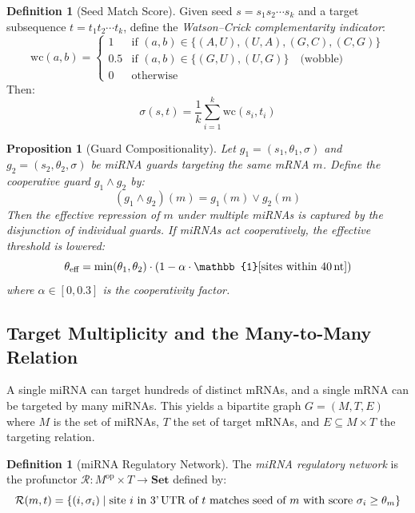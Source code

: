 \documentclass[12pt,a4paper]{article}
\newtheorem{proposition}[theorem]{Proposition}
\theoremstyle{definition}
\newtheorem{definition}[theorem]{Definition}
\newcommand{\Set}{\mathbf{Set}}
\begin{document}
\begin{definition}[Seed Match Score]\label{def:seed-score}
Given seed $s = s_1 s_2 \cdots s_k$ and a target subsequence
$t = t_1 t_2 \cdots t_k$, define the \emph{Watson--Crick complementarity
indicator}:
\[
  \mathrm{wc}(a, b) =
  \begin{cases}
    1 & \text{if } (a,b) \in \{(A,U),(U,A),(G,C),(C,G)\} \\
    0.5 & \text{if } (a,b) \in \{(G,U),(U,G)\} \quad\text{(wobble)} \\
    0 & \text{otherwise}
  \end{cases}
\]
Then:
\[
  \sigma(s, t) = \frac{1}{k}\sum_{i=1}^{k} \mathrm{wc}(s_i, t_i)
\]
\end{definition}

\begin{proposition}[Guard Compositionality]\label{prop:guard-compose}
Let $g_1 = (s_1, \theta_1, \sigma)$ and $g_2 = (s_2, \theta_2, \sigma)$
be miRNA guards targeting the same mRNA $m$.  Define the
\emph{cooperative guard} $g_1 \wedge g_2$ by:
\[
  (g_1 \wedge g_2)(m) = g_1(m) \lor g_2(m)
\]
Then the effective repression of $m$ under multiple miRNAs is captured by
the disjunction of individual guards.  If miRNAs act cooperatively, the
effective threshold is lowered:
\[
  \theta_{\text{eff}} = \min(\theta_1, \theta_2) \cdot
  (1 - \alpha \cdot \mathbb{1}[\text{sites within 40\,nt}])
\]
where $\alpha \in [0, 0.3]$ is the cooperativity factor.
\end{proposition}

\subsection{Target Multiplicity and the Many-to-Many Relation}

A single miRNA can target hundreds of distinct mRNAs, and a single mRNA
can be targeted by many miRNAs.  This yields a bipartite graph
$G = (M, T, E)$ where $M$ is the set of miRNAs, $T$ the set of target
mRNAs, and $E \subseteq M \times T$ the targeting relation.

\begin{definition}[miRNA Regulatory Network]
The \emph{miRNA regulatory network} is the profunctor
$\mathcal{R} : M^{\mathrm{op}} \times T \to \Set$ defined by:
\[
  \mathcal{R}(m, t) = \{(i, \sigma_i) \mid
    \text{site } i \text{ in 3'\,UTR of } t \text{ matches seed of } m
    \text{ with score } \sigma_i \geq \theta_m\}
\]
\end{definition}
\end{document}
